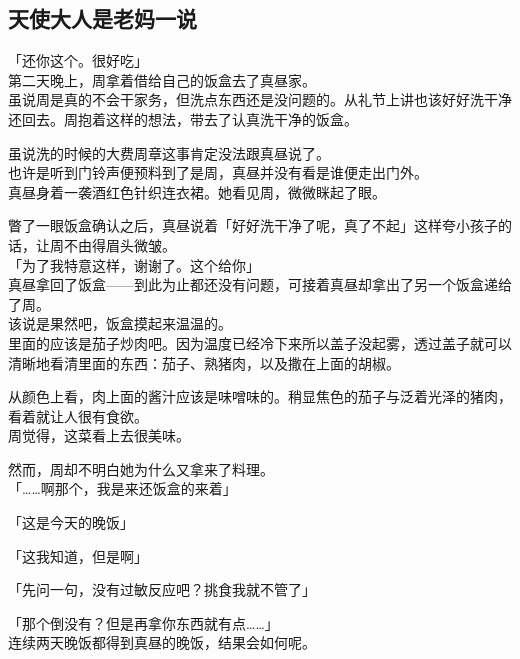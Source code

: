 \subsection{天使大人是老妈一说}

「还你这个。很好吃」\\

第二天晚上，周拿着借给自己的饭盒去了真昼家。\\

虽说周是真的不会干家务，但洗点东西还是没问题的。从礼节上讲也该好好洗干净还回去。周抱着这样的想法，带去了认真洗干净的饭盒。

虽说洗的时候的大费周章这事肯定没法跟真昼说了。\\

也许是听到门铃声便预料到了是周，真昼并没有看是谁便走出门外。\\

真昼身着一袭酒红色针织连衣裙。她看见周，微微眯起了眼。

瞥了一眼饭盒确认之后，真昼说着「好好洗干净了呢，真了不起」这样夸小孩子的话，让周不由得眉头微皱。\\

「为了我特意这样，谢谢了。这个给你」\\

真昼拿回了饭盒——到此为止都还没有问题，可接着真昼却拿出了另一个饭盒递给了周。\\

该说是果然吧，饭盒摸起来温温的。\\

里面的应该是茄子炒肉吧。因为温度已经冷下来所以盖子没起雾，透过盖子就可以清晰地看清里面的东西：茄子、熟猪肉，以及撒在上面的胡椒。

从颜色上看，肉上面的酱汁应该是味噌味的。稍显焦色的茄子与泛着光泽的猪肉，看着就让人很有食欲。\\

周觉得，这菜看上去很美味。

然而，周却不明白她为什么又拿来了料理。\\

「……啊那个，我是来还饭盒的来着」

「这是今天的晚饭」

「这我知道，但是啊」

「先问一句，没有过敏反应吧？挑食我就不管了」

「那个倒没有？但是再拿你东西就有点……」\\

连续两天晚饭都得到真昼的晚饭，结果会如何呢。\\

